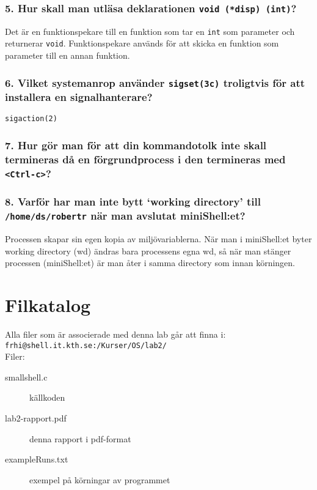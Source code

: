 \documentclass[a4paper]{article}
\begin{document}
\subsubsection*{5. Hur skall man utläsa deklarationen \texttt{void (*disp) (int)}?}
Det är en funktionspekare till en funktion som tar en \texttt{int} som parameter och returnerar \texttt{void}. Funktionspekare används för att skicka en funktion som parameter till en annan funktion.

\subsubsection*{6. Vilket systemanrop använder \texttt{sigset(3c)} troligtvis för att installera en signalhanterare?}
\texttt{sigaction(2)}

\subsubsection*{7. Hur gör man för att din kommandotolk inte skall termineras då en förgrundprocess i den termineras med \texttt{<Ctrl-c>}?}


\subsubsection*{8. Varför har man inte bytt `working directory' till \texttt{/home/ds/robertr} när man avslutat miniShell:et?}
Processen skapar sin egen kopia av miljövariablerna. När man i miniShell:et byter working directory (wd) ändras bara processens egna wd, så när man stänger processen (miniShell:et) är man åter i samma directory som innan körningen.

\section*{Filkatalog}
Alla filer som är associerade med denna lab går att finna i:\\
\texttt{frhi@shell.it.kth.se:/Kurser/OS/lab2/}
\\
Filer:
\begin{description}
\item[smallshell.c] källkoden
\item[lab2-rapport.pdf] denna rapport i pdf-format
\item[exampleRuns.txt] exempel på körningar av programmet
\end{description}
\end{document}
